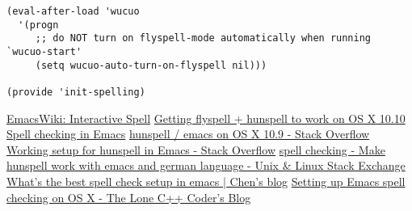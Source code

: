 \documentclass[11pt]{article}
\begin{document}
\begin{verbatim}
(eval-after-load 'wucuo
  '(progn
     ;; do NOT turn on flyspell-mode automatically when running `wucuo-start'
     (setq wucuo-auto-turn-on-flyspell nil)))

(provide 'init-spelling)
\end{verbatim}

\label{sec:org7bef998}
\href{http://emacswiki.org/emacs/InteractiveSpell\#toc2}{EmacsWiki: Interactive Spell}
\href{https://lists.gnu.org/archive/html/help-gnu-emacs/2015-03/msg00153.html}{Getting flyspell + hunspell to work on OS X 10.10}
\href{https://joelkuiper.eu/spellcheck\_emacs}{Spell checking in Emacs}
\href{http://stackoverflow.com/questions/25415070/hunspell-emacs-on-os-x-10-9}{hunspell / emacs on OS X 10.9 - Stack Overflow}
\href{http://stackoverflow.com/questions/3961119/working-setup-for-hunspell-in-emacs}{Working setup for hunspell in Emacs - Stack Overflow}
\href{http://unix.stackexchange.com/questions/86554/make-hunspell-work-with-emacs-and-german-language}{spell checking - Make hunspell work with emacs and german language - Unix \& Linux Stack Exchange}
\href{http://blog.binchen.org/posts/what-s-the-best-spell-check-set-up-in-emacs.html}{What's the best spell check setup in emacs | Chen's blog}
\href{http://www.lonecpluspluscoder.com/2015/03/setting-up-emacs-spell-checking-on-os-x/}{Setting up Emacs spell checking on OS X - The Lone C++ Coder's Blog}
\label{sec:org18b6ecf}
\end{document}

